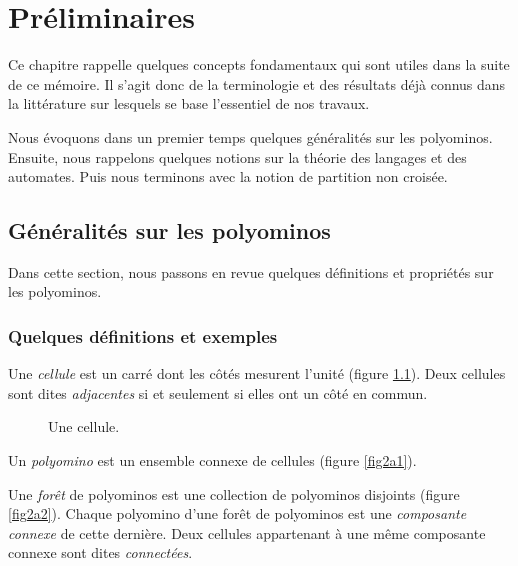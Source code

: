 \chapter{Préliminaires}
Ce chapitre  rappelle quelques concepts fondamentaux qui sont utiles dans la suite de ce mémoire. Il s'agit donc de la terminologie et des résultats déjà connus dans la littérature sur lesquels se base l'essentiel de nos travaux. 

Nous évoquons dans  un premier temps quelques généralités sur les polyominos.  Ensuite, nous rappelons quelques notions sur la théorie des langages et des automates. Puis nous terminons avec la notion de partition non croisée.
\section{Généralités sur les polyominos}
Dans cette section, nous passons en revue quelques définitions et propriétés  sur les polyominos.
\begin{spacing}{0.30}
\subsection{Quelques définitions et exemples}
\end{spacing}
 Une \emph{cellule} est un carré dont les côtés mesurent l'unité (figure \ref{fig1}). Deux cellules sont dites \emph{adjacentes} si et seulement si elles ont un côté en commun.
\begin{figure}[!htb]
\begin{minipage}[c]{.2\linewidth}
  \centering
\end{minipage}
\hfill
  \begin{minipage}[c]{.76\linewidth}
  \centering
\begin{logicpuzzle}[rows=1,columns=1,color=cyan!100]
\framepuzzle[black!50]
\end{logicpuzzle}%
\end{minipage}
 \caption{\label{fig1} Une cellule.}
\hfill
\end{figure}
 Un \emph{polyomino} est un ensemble connexe de cellules (figure \ref{fig2a1}).

 Une \emph{forêt} de polyominos est une collection de polyominos disjoints (figure \ref{fig2a2}). Chaque polyomino d'une forêt de polyominos est une \emph{composante connexe} de cette dernière. Deux cellules appartenant à une même composante connexe sont dites \emph{connectées}.
 

